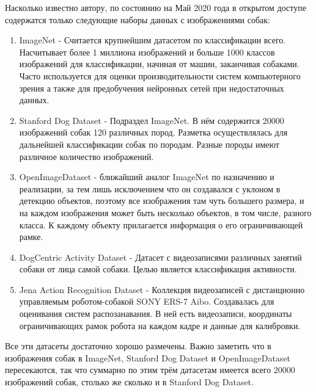 Насколько известно автору, по состоянию на Май 2020 года в открытом доступе содержатся только следующие наборы данных с изображениями собак:
\begin{enumerate}
  \item ImageNet \cite{imagenet} - Считается крупнейшим датасетом по классификации всего. Насчитывает более 1 миллиона изображений и больше 1000 классов изображений для классификации, начиная от машин, заканчивая собаками. Часто используется для оценки производительности систем компьютерного зрения а также для предобучения нейронных сетей при недостаточных данных.
  \item Stanford Dog Dataset \cite{KhoslaYaoJayadevaprakashFeiFei_FGVC2011} - Подраздел ImageNet. В нём содержится 20000 изображений собак 120 различных пород. Разметка осуществлялась для дальнейшей классификации собак по породам. Разные породы имеют различное количество изображений.
  \item OpenImageDataset \cite{openimages} - ближайший аналог ImageNet по назначению и реализации, за тем лишь исключением что он создавался с уклоном в детекцию объектов, поэтому все изображения там чуть большего размера, и на каждом изображения может быть несколько объектов, в том числе, разного класса. К каждому объекту прилагается информация о его ограничивающей рамке.
  \item DogCentric Activity Dataset \cite{yumi2014first} - Датасет с видеозаписями различных занятий собаки от лица самой собаки. Целью является классификация активности.
  \item Jena Action Recognition Dataset \cite{jena} - Коллекция видеозаписей с дистанционно управляемым роботом-собакой SONY ERS-7 Aibo. Создавалась для оценивания систем распозанавания. В ней есть видеозаписи, координаты ограничивающих рамок робота на каждом кадре и данные для калибровки.
\end{enumerate}
Все эти датасеты достаточно хорошо размечены. Важно заметить что в изображения собак в ImageNet, Stanford Dog Dataset и OpenImageDataset пересекаются, так что суммарно по этим трём датасетам имеется всего 20000 изображений собак, столько же сколько и в Stanford Dog Dataset.